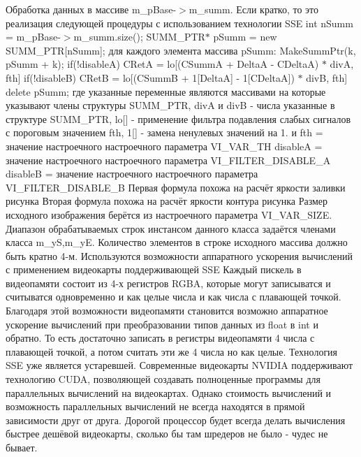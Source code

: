 Обработка данных в массиве m\+\_\+p\+Base-\/$>$m\+\_\+summ. Если кратко, то это реализация следующей процедуры с использованием технологии S\+S\+E int n\+Summ = m\+\_\+p\+Base-\/$>$m\+\_\+summ.\+size(); S\+U\+M\+M\+\_\+\+P\+T\+R$\ast$ p\+Summ = new S\+U\+M\+M\+\_\+\+P\+T\+R\mbox{[}n\+Summ\mbox{]}; для каждого элемента массива p\+Summ\+: Make\+Summ\+Ptr(k, p\+Summ + k); if(!disable\+A) C\+Ret\+A = lo\mbox{[}(C\+Summ\+A + Delta\+A -\/ C\+Delta\+A) $\ast$ div\+A, fth\mbox{]} if(!disable\+B) C\+Ret\+B = lo\mbox{[}(C\+Summ\+B + 1\mbox{[}Delta\+A\mbox{]} -\/ 1\mbox{[}C\+Delta\+A\mbox{]}) $\ast$ div\+B, fth\mbox{]} delete p\+Summ; где указанные переменные являются массивами на которые указывают члены структуры S\+U\+M\+M\+\_\+\+P\+T\+R, div\+A и div\+B -\/ числа указанные в структуре S\+U\+M\+M\+\_\+\+P\+T\+R, lo\mbox{[}\mbox{]} -\/ применение фильтра подавления слабых сигналов с пороговым значением fth, 1\mbox{[}\mbox{]} -\/ замена ненулевых значений на 1. и fth = значение настроечного настроечного параметра V\+I\+\_\+\+V\+A\+R\+\_\+\+T\+H disable\+A = значение настроечного настроечного параметра V\+I\+\_\+\+F\+I\+L\+T\+E\+R\+\_\+\+D\+I\+S\+A\+B\+L\+E\+\_\+\+A disable\+B = значение настроечного настроечного параметра V\+I\+\_\+\+F\+I\+L\+T\+E\+R\+\_\+\+D\+I\+S\+A\+B\+L\+E\+\_\+\+B Первая формула похожа на расчёт яркости заливки рисунка Вторая формула похожа на расчёт яркости контура рисунка Размер исходного изображения берётся из настроечного параметра V\+I\+\_\+\+V\+A\+R\+\_\+\+S\+I\+Z\+E. Диапазон обрабатываемых строк инстансом данного класса задаётся членами класса m\+\_\+y\+S,m\+\_\+y\+E. Количество элементов в строке исходного массива должно быть кратно 4-\/м. Используются возможности аппаратного ускорения вычислений с применением видеокарты поддерживающей S\+S\+E Каждый пискель в видеопамяти состоит из 4-\/х регистров R\+G\+B\+A, которые могут записыватся и считыватся одновременно и как целые числа и как числа с плавающей точкой. Благодаря этой возможности видеопамяти становится возможно аппаратное ускорение вычислений при преобразовании типов данных из float в int и обратно. То есть достаточно записать в регистры видеопамяти 4 числа с плавающей точкой, а потом считать эти же 4 числа но как целые. Технология S\+S\+E уже является устаревшей. Современные видеокарты N\+V\+I\+D\+I\+A поддерживают технологию C\+U\+D\+A, позволяющей создавать полноценные программы для параллельных вычислений на видеокартах. Однако стоимость вычислений и возможность параллельных вычислений не всегда находятся в прямой зависимости друг от друга. Дорогой процессор будет всегда делать вычисления быстрее дешёвой видеокарты, сколько бы там шредеров не было -\/ чудес не бывает. 

